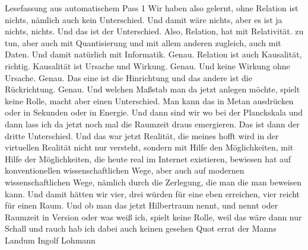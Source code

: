 \documentclass[11pt,a4paper]{article}
\begin{document}
\begin{asrbox}{Lesefassung aus automatischem Pass 1}
Wir haben also gelernt, ohne Relation ist nichts, nämlich auch kein Unterschied. Und damit wäre nichts, aber es ist ja nichts, nichts. Und das ist der Unterschied. Also, Relation, hat mit Relativität. zu tun, aber auch mit Quantisierung und mit allem anderen zugleich, auch mit Daten. Und damit natürlich mit Informatik. Genau. Relation ist auch Kausalität, richtig. Kausalität ist Ursache und Wirkung. Genau. Und keine Wirkung ohne Ursache. Genau. Das eine ist die Hinrichtung und das andere ist die Rückrichtung. Genau. Und welchen Maßstab man da jetzt anlegen möchte, spielt keine Rolle, macht aber einen Unterschied. Man kann das in Metan ausdrücken oder in Sekunden oder in Energie. Und dann sind wir wo bei der Planckskala und dann lass ich da jetzt noch mal die Raumzeit draus emergieren. Das ist dann der dritte Unterschied. Und das war jetzt Realität, die meines hofft wird in der virtuellen Realität nicht nur versteht, sondern mit Hilfe den Möglichkeiten, mit Hilfe der Möglichkeiten, die heute real im Internet existieren, bewiesen hat auf konventionellen wissenschaftlichen Wege, aber auch auf modernen wissenschaftlichen Wege, nämlich durch die Zerlegung, die man die man beweisen kann. Und damit hätten wir vier, drei würden für eine eben erreichen, vier reicht für einen Raum. Und ob man das jetzt Hilbertraum nennt, und nennt oder Raumzeit in Version oder was weiß ich, spielt keine Rolle, weil das wäre dann nur Schall und rauch hab ich dabei auch keinen gesehen Quot errat der Manns Landum Ingolf Lohmann
\end{asrbox}
\end{document}
